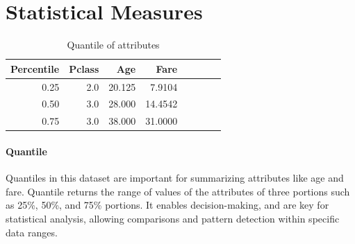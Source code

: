 \documentclass[a4paper, 12pt]{article}
\begin{document}
\begin{table}[h]
\section*{Statistical Measures}
  \centering
  \begin{tabular}{|r|r|r|r|r|r|r|r|}
    \hline
    \textbf{Percentile} & \textbf{Pclass} & \textbf{Age} & \textbf{Fare} \\
    \hline
    0.25 & 2.0 & 20.125 & 7.9104 \\
    0.50 & 3.0 & 28.000 & 14.4542 \\
    0.75 & 3.0 & 38.000 & 31.0000 \\
    \hline
  \end{tabular}
  \caption{Quantile of attributes} 
  \paragraph*{Quantile}
  \justifying
Quantiles in this dataset are important for summarizing attributes like age and fare. Quantile returns the range of values of the attributes of three portions such as 25\%, 50\%, and 75\% portions. It enables decision-making, and are key for statistical analysis, allowing comparisons and pattern detection within specific data ranges.
\end{table} 
\end{document}

